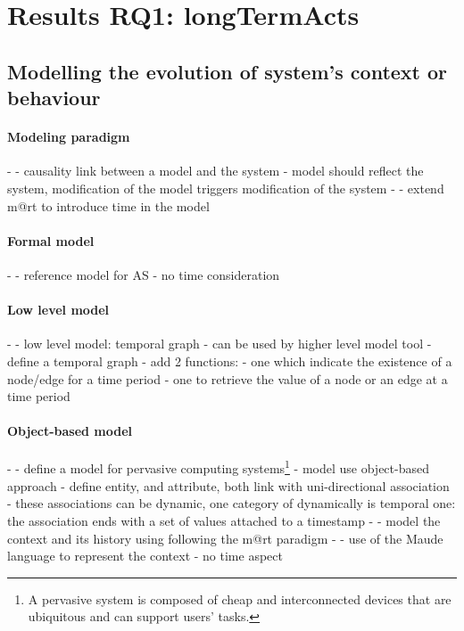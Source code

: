 \section[Results RQ1: long-term actions]{Results RQ1: \glspl{longTermAct}}
\label{sec:sota:results:actions}

\subsection[Modelling the evolution of system's context or behaviour]{Modelling the evolution of system's context or \gls{behaviour}}


\paragraph{Modeling paradigm}
- \cite{DBLP:journals/computer/BlairBF09, DBLP:journals/computer/MorinBJFS09}
	- causality link between a model and the system
	- model should reflect the system, modification of the model triggers modification of the system
- \cite{DBLP:conf/seke/0001FNMKT14, DBLP:conf/models/0001FNMKBT14}
	- extend \gls{m@rt} to introduce time in the model

\paragraph{Formal model} %
- \cite{DBLP:journals/taas/WeynsMA12}
	- reference model for AS
	- no time consideration

\paragraph{Low level model} %
- \cite{DBLP:conf/dbpl/MoffittS17}
	- low level model: temporal graph
	- can be used by higher level model tool
	- define a temporal graph
	- add 2 functions:
		- one which indicate the existence of a node/edge for a time period
		- one to retrieve the value of a node or an edge at a time period
		
\paragraph{Object-based model} %
- \cite{DBLP:conf/pervasive/HenricksenIR02}
	- define a model for pervasive computing systems\footnote{A pervasive system is composed of cheap and interconnected devices that are ubiquitous and can support users' tasks.\cite{DBLP:conf/pervasive/HenricksenIR02}}
	- model use object-based approach
	- define entity, and attribute, both link with uni-directional association
	- these associations can be dynamic, one category of dynamically is temporal one: the association ends with a set of values attached to a timestamp
- \cite{DBLP:conf/smartgridsec/0001FKNT14}
	- model the context and its history using following the \gls{m@rt} paradigm
- \cite{DBLP:conf/icse/TaharaOH17}
	- use of the Maude~\cite{DBLP:journals/tcs/ClavelDELMMQ02} language  to represent the context
	- no time aspect
	

